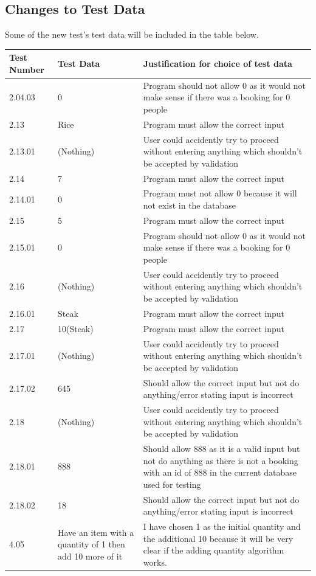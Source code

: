 \subsection{Changes to Test Data}

Some of the new test's test data will be included in the table below.

\begin{center}
    \begin{tabular}{|p{2cm}|p{3cm}|p{7cm}|}
        \hline
        \textbf{Test Number} & \textbf{Test Data} & \textbf{Justification for choice of test data}\\ \hline

	2.04.03 & 0 & Program should not allow 0 as it would not make sense if there was a booking for 0 people \\ \hline
	2.13 & Rice & Program must allow the correct input \\ \hline
	2.13.01 & (Nothing) &User could accidently try to proceed without entering anything which shouldn't be accepted by validation \\ \hline
	2.14 & 7 & Program must allow the correct input \\ \hline
	2.14.01 & 0 & Program must not allow 0 because it will not exist in the database \\ \hline
	2.15 & 5 & Program must allow the correct input  \\ \hline
	2.15.01 & 0 & Program should not allow 0 as it would not make sense if there was a booking for 0 people  \\ \hline
	2.16& (Nothing) & User could accidently try to proceed without entering anything which shouldn't be accepted by validation \\ \hline
	2.16.01 & Steak & Program must allow the correct input \\ \hline
	2.17 & 10(Steak) & Program must allow the correct input \\ \hline
	2.17.01& (Nothing) &User could accidently try to proceed without entering anything which shouldn't be accepted by validation \\ \hline
	2.17.02 & 645& Should allow the correct input but not do anything/error stating input is incorrect \\ \hline
	2.18& (Nothing) & User could accidently try to proceed without entering anything which shouldn't be accepted by validation \\ \hline
	2.18.01 & 888 & Should allow 888 as it is a valid input but not do anything as there is not a booking with an id of 888 in the current database used for testing \\ \hline
	2.18.02 & 18& Should allow the correct input but not do anything/error stating input is incorrect \\ \hline

	4.05 & Have an item with a quantity of 1 then add 10 more of it & I have chosen 1 as the initial quantity and the additional 10 because it will be very clear if the adding quantity algorithm works. \\ \hline

    \end{tabular}
\end{center}

